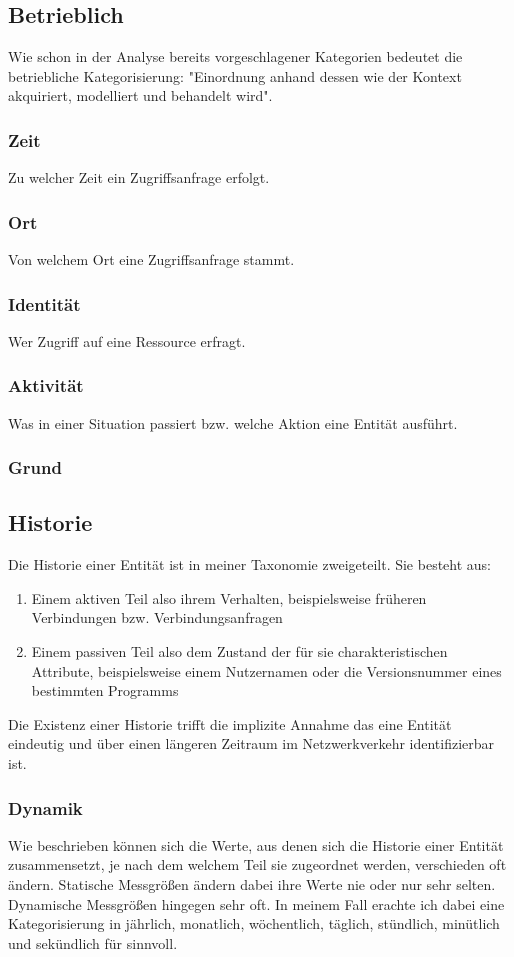 \subsection{Betrieblich}
Wie schon in der Analyse bereits vorgeschlagener Kategorien bedeutet die betriebliche Kategorisierung: "Einordnung anhand dessen wie der Kontext akquiriert, modelliert und behandelt wird".
\subsubsection{Zeit}
Zu welcher Zeit ein Zugriffsanfrage erfolgt.
\subsubsection{Ort}
Von welchem Ort eine Zugriffsanfrage stammt.
\subsubsection{Identität}
Wer Zugriff auf eine Ressource erfragt.
\subsubsection{Aktivität}
Was in einer Situation passiert bzw. welche Aktion eine Entität ausführt.
\subsubsection{Grund}
\subsection{Historie}
Die Historie einer Entität ist in meiner Taxonomie zweigeteilt. Sie besteht aus:
\begin{enumerate}
\item{Einem aktiven Teil also ihrem Verhalten, beispielsweise früheren Verbindungen bzw. Verbindungsanfragen}
\item{Einem passiven Teil also dem Zustand der für sie charakteristischen Attribute, beispielsweise einem Nutzernamen oder die Versionsnummer eines bestimmten Programms}
\end{enumerate}
Die Existenz einer Historie trifft die implizite Annahme das eine Entität eindeutig und über einen längeren Zeitraum im Netzwerkverkehr identifizierbar ist.
\subsubsection{Dynamik}
Wie 
 beschrieben können sich die Werte, aus denen sich die Historie einer Entität zusammensetzt, je nach dem welchem Teil sie zugeordnet werden, verschieden oft ändern.
Statische Messgrößen ändern dabei ihre Werte nie oder nur sehr selten. Dynamische Messgrößen hingegen sehr oft. In meinem Fall erachte ich dabei eine Kategorisierung in jährlich, monatlich, wöchentlich, täglich, stündlich, minütlich und sekündlich für sinnvoll.
